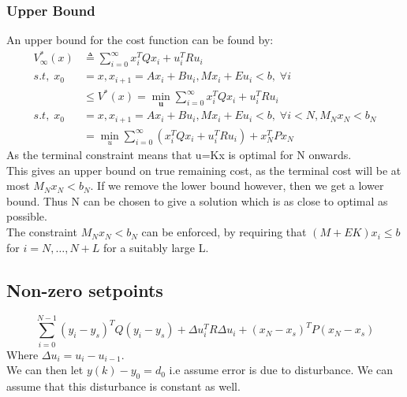 \documentclass{article}
\begin{document}
\subsubsection*{Upper Bound}
An upper bound for the cost function can be found by:
\[
\begin{aligned}
    V_\infty^*(x) &\triangleq \sum_{i=0}^\infty x_i^TQx_i + u_i^TRu_i \\
    s.t, \; x_0 &= x, x_{i+1} = Ax_i + Bu_i, Mx_i + Eu_i < b, \; \forall i \\
    & \leq V^*(x) = \min_\textbf{u} \sum_{i=0}^\infty x_i^TQx_i + u_i^TRu_i \\
    s.t, \; x_0 &= x, x_{i+1} = Ax_i + Bu_i, Mx_i + Eu_i < b, \; \forall i < N, M_Nx_N < b_N \\
    &= \min_u \sum_{i=0}^\infty \left( x_i^TQx_i + u_i^TRu_i \right)+ x_N^T Px_N
\end{aligned}
\]
As the terminal constraint means that u=Kx is optimal for N onwards.
\\
This gives an upper bound on true remaining cost, as the terminal cost will be at most $M_N x_N < b_N$. If we remove the lower bound however, then we get a lower bound. Thus N can be chosen to give a solution which is as close to optimal as possible. \\
The constraint $M_N x_N < b_N$ can be enforced, by requiring that $(M+EK)x_i \leq b$ for $i=N,\hdots, N+L$ for a suitably large L.
\subsection{Non-zero setpoints}
\[
\sum_{i=0}^{N-1}(y_i-y_s)^TQ(y_i-y_s) + \Delta u_i^T R \Delta u_i + (x_N - x_s)^T P (x_N - x_s)
\]
Where $\Delta u_i = u_i - u_{i-1}$. \\
We can then let $y(k) -y_0 = d_0$ i.e assume error is due to disturbance. We can assume that this disturbance is constant as well.
\end{document}
